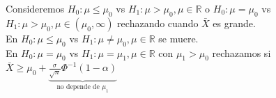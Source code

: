 \documentclass[10pt]{article}
\theoremstyle{plain}
\theoremstyle{definition}
\begin{document}
Consideremos $H_{0}: \mu \le \mu_{0}$ vs $H_{1}: \mu > \mu_{0}, \mu \in \mathbb{R}$ o $H_{0}: \mu = \mu_{0}$ vs $H_{1}: \mu > \mu_{0}, \mu \in (\mu_{0}, \infty)$ rechazando cuando $\bar{X}$ es grande.\\

En $H_{0}: \mu \le \mu_{0}$ vs $H_{1}: \mu \not = \mu_{0}, \mu \in \mathbb{R}$ se muere.\\

En $H_{0}: \mu = \mu_{0}$ vs $H_{1}: \mu = \mu_{1}, \mu \in \mathbb{R}$ con $\mu_{1}>\mu_{0}$ rechazamos si $\bar{X}\ge \mu_{0} + \underbrace{\frac{\sigma}{\sqrt{n}}\Phi^{-1}(1-\alpha)}_{\text{no depende de $\mu_{1}$}}$
\end{document}

